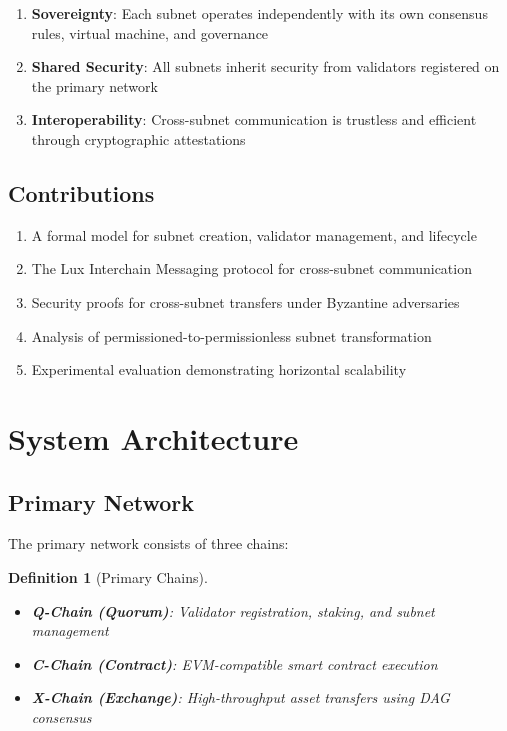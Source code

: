 \documentclass[11pt,a4paper]{article}
\newtheorem{definition}{Definition}
\begin{document}
\begin{enumerate}
    \item \textbf{Sovereignty}: Each subnet operates independently with its own consensus rules, virtual machine, and governance
    \item \textbf{Shared Security}: All subnets inherit security from validators registered on the primary network
    \item \textbf{Interoperability}: Cross-subnet communication is trustless and efficient through cryptographic attestations
\end{enumerate}

\subsection{Contributions}

\begin{enumerate}
    \item A formal model for subnet creation, validator management, and lifecycle
    \item The Lux Interchain Messaging protocol for cross-subnet communication
    \item Security proofs for cross-subnet transfers under Byzantine adversaries
    \item Analysis of permissioned-to-permissionless subnet transformation
    \item Experimental evaluation demonstrating horizontal scalability
\end{enumerate}

\section{System Architecture}

\subsection{Primary Network}

The primary network consists of three chains:

\begin{definition}[Primary Chains]
\begin{itemize}
    \item \textbf{Q-Chain (Quorum)}: Validator registration, staking, and subnet management
    \item \textbf{C-Chain (Contract)}: EVM-compatible smart contract execution
    \item \textbf{X-Chain (Exchange)}: High-throughput asset transfers using DAG consensus
\end{itemize}
\end{definition}
\end{document}
